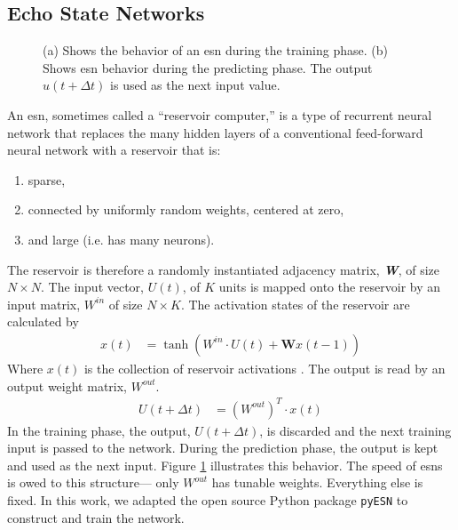 \subsection{Echo State Networks}

\begin{figure}[htp]
  \centering


  \caption{(a) Shows the behavior of an \gls{esn} during the training phase. (b) Shows \gls{esn} behavior during the predicting phase. The output $u(t+\Delta t)$ is used as the next input value. }
  \label{fig:reservoir_graph}
\end{figure}

An \gls{esn}, sometimes called a ``reservoir
computer,''\cite{pathak_using_2017, pathak_model-free_2018, vlachas_backpropagation_2020} is a type of recurrent
neural network that replaces the many hidden layers of a conventional feed-forward
neural network with a reservoir that is:
\begin{enumerate}
  \item sparse,
  \item connected by uniformly random weights, centered at zero,
  \item and large (i.e. has many neurons).
\end{enumerate}

The reservoir is therefore a randomly instantiated adjacency matrix,
\textit{\textbf{W}}, of size $N \times N$. The input vector, $U(t)$, of
$K$ units is mapped onto the reservoir by an input matrix,
 $W^{in}$ of size $N \times K$. The activation states of the reservoir are calculated by
 \begin{align}
   x(t) &= \tanh \left(W^{in}\cdot U(t) + \mathbf{W}x(t-1)\right)
 \end{align}
 Where $x(t)$ is the collection of reservoir activations \cite{shi_energy_2016, pathak_model-free_2018, lukosevicius_practical_2012}.
 The output is read by an output weight matrix,
 $W^{out}$.
 \begin{align}
   U(t+\Delta t) &= \left(W^{out}\right)^T\cdot x(t)
 \end{align}
 In the training phase, the output, $U(t+\Delta t)$, is
 discarded and the next training input is passed to the network. During the
 prediction phase, the output is kept and used as the next input. Figure \ref{fig:reservoir_graph} illustrates this behavior. The speed of \glspl{esn} is owed
 to this structure--- only $W^{out}$ has tunable weights. Everything else is
 fixed. In this work, we adapted the open source Python package \texttt{pyESN} \cite{korndorfer_pyesn_2015} to construct and train the network.

